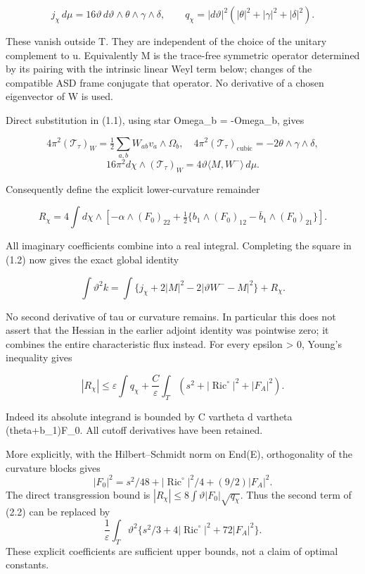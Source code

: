 \documentclass[
  10pt,
]{article}
\begin{document}
\[
 j_\chi\,d\mu=16\vartheta\,d\vartheta\wedge\theta\wedge\gamma\wedge\delta,
 \qquad
 q_\chi=|d\vartheta|^2(|\theta|^2+|\gamma|^2+|\delta|^2).
\]

These vanish outside T. They are independent of the choice of the
unitary complement to u. Equivalently M is the trace-free symmetric
operator determined by its pairing with the intrinsic linear Weyl term
below; changes of the compatible ASD frame conjugate that operator. No
derivative of a chosen eigenvector of W is used.

Direct substitution in (1.1), using star Omega\_b = -Omega\_b, gives

\[
 4\pi^2(\mathcal T_\tau)_W
       =\tfrac12\sum_{a,b}W_{ab}v_a\wedge\Omega_b,\quad
 4\pi^2(\mathcal T_\tau)_{\mathrm{cubic}}
                                  =-2\theta\wedge\gamma\wedge\delta,
\] \[
 16\pi^2d\chi\wedge(\mathcal T_\tau)_W
                       =4\vartheta\langle M,W^-\rangle\,d\mu.
\]

Consequently define the explicit lower-curvature remainder

\[
 R_\chi=4\int d\chi\wedge\left[
 -\alpha\wedge(F_0)_{22}
 +\tfrac12\{b_1\wedge(F_0)_{12}-\bar b_1\wedge(F_0)_{21}\}\right].
\]

All imaginary coefficients combine into a real integral. Completing the
square in (1.2) now gives the exact global identity

\[
 \boxed{\int\vartheta^2k
 =\int\{j_\chi+2|M|^2-2|\vartheta W^--M|^2\}+R_\chi.}     \tag{2.1}
\]

No second derivative of tau or curvature remains. In particular this
does not assert that the Hessian in the earlier adjoint identity was
pointwise zero; it combines the entire characteristic flux instead. For
every epsilon \textgreater{} 0, Young's inequality gives

\[
 |R_\chi|\le\varepsilon\int q_\chi
 +\frac C\varepsilon\int_T
       (s^2+|\operatorname{Ric}^{\circ}|^2+|F_A|^2).       \tag{2.2}
\]

Indeed its absolute integrand is bounded by C vartheta \textbar d
vartheta\textbar{}
(\textbar theta\textbar+\textbar b\_1\textbar)\textbar F\_0\textbar. All
cutoff derivatives have been retained.

More explicitly, with the Hilbert--Schmidt norm on End(E), orthogonality
of the curvature blocks gives \[
 |F_0|^2=s^2/48+|\operatorname{Ric}^{\circ}|^2/4+(9/2)|F_A|^2.
\] The direct transgression bound is
\(|R_\chi|\le8\int\vartheta|F_0|\sqrt{q_\chi}\). Thus the second term of
(2.2) can be replaced by \[
 \frac1\varepsilon\int_T\vartheta^2
           \{s^2/3+4|\operatorname{Ric}^{\circ}|^2+72|F_A|^2\}.
\] These explicit coefficients are sufficient upper bounds, not a claim
of optimal constants.
\end{document}
